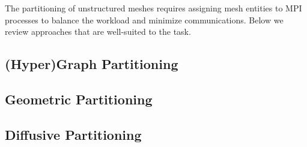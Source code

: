 The partitioning of unstructured meshes requires assigning mesh entities to MPI
processes to balance the workload and minimize communications.
Below we review approaches that are well-suited to the task.

\subsection{(Hyper)Graph Partitioning} \label{sec:graph}


\subsection{Geometric Partitioning} \label{sec:geometric}


\subsection{Diffusive Partitioning} \label{sec:diffusive}

